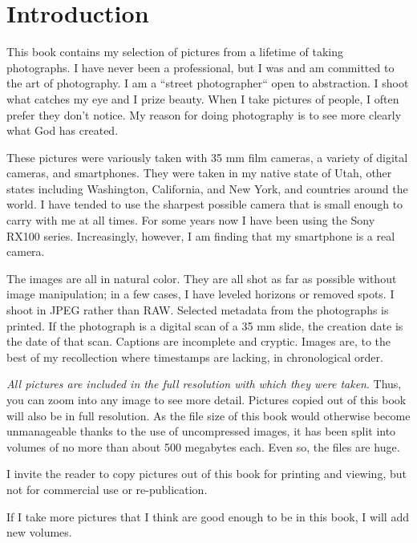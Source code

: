 \chapter{Introduction}

This book contains my selection of pictures from a lifetime of taking photographs. I have never been a professional, but I was and am committed to the art of photography. I am a ``street photographer`` open to abstraction. I shoot what catches my eye and I prize beauty. When I take pictures of people, I often prefer they don't notice. My reason for doing photography is to see more clearly what God has created.

These pictures were variously taken with 35 mm film cameras, a variety of digital cameras, and smartphones. They were taken in my native state of Utah, other states including Washington, California, and New York, and countries around the world. I have tended to use the sharpest possible camera that is small enough to carry with me at all times. For some years now I have been using the Sony RX100 series. Increasingly, however, I am finding that my smartphone is a real camera.

The images are all in natural color. They are all shot as far as possible without image manipulation; in a few cases, I have leveled horizons or removed spots. I shoot in JPEG rather than RAW. Selected metadata from the photographs is printed. If the photograph is a digital scan of a 35 mm slide, the creation date is the date of that scan. Captions are incomplete and cryptic. Images are, to the best of my recollection where timestamps are lacking, in chronological order.

\emph{All pictures are included in the full resolution with which they were taken}. Thus, you can zoom into any image to see more detail. Pictures copied out of this book will also be in full resolution. As the file size of this book would otherwise become unmanageable thanks to the use of uncompressed images, it has been split into volumes of no more than about 500 megabytes each. Even so, the files are huge.

I invite the reader to copy pictures out of this book for printing and viewing, but not for commercial use or re-publication. 

If I take more pictures that I think are good enough to be in this book, I will add new volumes.
